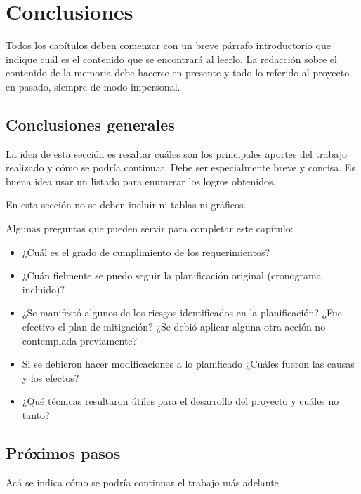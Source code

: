 
\chapter{Conclusiones} %

\label{Chapter5} %
Todos los capítulos deben comenzar con un breve párrafo introductorio que indique cuál es el contenido que se encontrará al leerlo.  La redacción sobre el contenido de la memoria debe hacerse en presente y todo lo referido al proyecto en pasado, siempre de modo impersonal.




\section{Conclusiones generales }

La idea de esta sección es resaltar cuáles son los principales aportes del trabajo realizado y cómo se podría continuar. Debe ser especialmente breve y concisa. Es buena idea usar un listado para enumerar los logros obtenidos.

En esta sección no se deben incluir ni tablas ni gráficos.

Algunas preguntas que pueden servir para completar este capítulo:

\begin{itemize}
\item ¿Cuál es el grado de cumplimiento de los requerimientos?
\item ¿Cuán fielmente se puedo seguir la planificación original (cronograma incluido)?
\item ¿Se manifestó algunos de los riesgos identificados en la planificación? ¿Fue efectivo el plan de mitigación? ¿Se debió aplicar alguna otra acción no contemplada previamente?
\item Si se debieron hacer modificaciones a lo planificado ¿Cuáles fueron las causas y los efectos?
\item ¿Qué técnicas resultaron útiles para el desarrollo del proyecto y cuáles no tanto?
\end{itemize}


\section{Próximos pasos}

Acá se indica cómo se podría continuar el trabajo más adelante.
